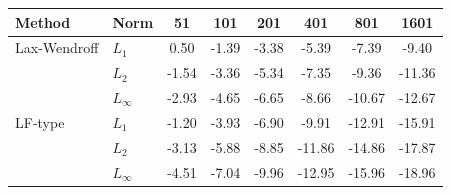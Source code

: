 \begin{tabular}{l l c c c c c c}
\toprule
Method & Norm & 51 & 101 & 201 & 401 & 801 & 1601 \\
\midrule
Lax-Wendroff & $L_1$ & 0.50 & -1.39 & -3.38 & -5.39 & -7.39 & -9.40 \\
 & $L_2$ & -1.54 & -3.36 & -5.34 & -7.35 & -9.36 & -11.36 \\
 & $L_\infty$ & -2.93 & -4.65 & -6.65 & -8.66 & -10.67 & -12.67 \\
\midrule
LF-type & $L_1$ & -1.20 & -3.93 & -6.90 & -9.91 & -12.91 & -15.91 \\
 & $L_2$ & -3.13 & -5.88 & -8.85 & -11.86 & -14.86 & -17.87 \\
 & $L_\infty$ & -4.51 & -7.04 & -9.96 & -12.95 & -15.96 & -18.96 \\
\bottomrule
\end{tabular}